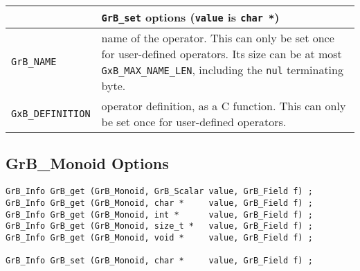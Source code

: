 \noindent
{\small
\begin{tabular}{p{2.2in}p{3.5in}}
\hline
                                    & \verb'GrB_set' options (\verb'value' is \verb'char *') \\
\hline
\verb'GrB_NAME'                     & name of the operator.  This can only be set once for user-defined operators.
                                        Its size can be at most \verb'GxB_MAX_NAME_LEN', including the
                                        \verb'nul' terminating byte. \\
\verb'GxB_DEFINITION'               & operator definition, as a C function.  This can only be
                                        set once for user-defined operators. \\
\hline
\end{tabular}
}

\newpage
\subsection{{\sf GrB\_Monoid} Options}
\label{get_set_monoid}

\begin{mdframed}[userdefinedwidth=6in]
{\footnotesize
\begin{verbatim}
GrB_Info GrB_get (GrB_Monoid, GrB_Scalar value, GrB_Field f) ;
GrB_Info GrB_get (GrB_Monoid, char *     value, GrB_Field f) ;
GrB_Info GrB_get (GrB_Monoid, int *      value, GrB_Field f) ;
GrB_Info GrB_get (GrB_Monoid, size_t *   value, GrB_Field f) ;
GrB_Info GrB_get (GrB_Monoid, void *     value, GrB_Field f) ;

GrB_Info GrB_set (GrB_Monoid, char *     value, GrB_Field f) ;
\end{verbatim}
}\end{mdframed}

